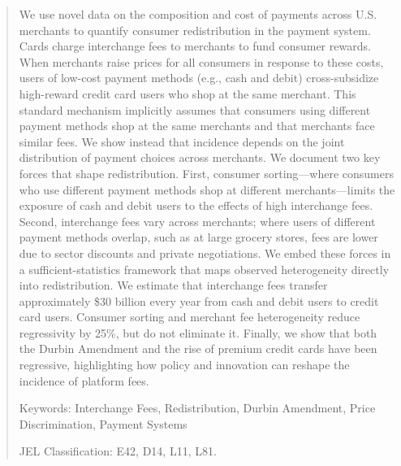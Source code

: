 \documentclass[11pt,english]{article}
\theoremstyle{remark}
\begin{document}
\begin{abstract}
\begin{singlespace}

We use novel data on the composition and cost of payments across U.S. merchants to quantify consumer redistribution in the payment system.
  Cards charge interchange fees to merchants to fund consumer rewards.
  When merchants raise prices for all consumers in response to these costs, users of low-cost payment methods (e.g., cash and debit) cross-subsidize high-reward credit card users who shop at the same merchant.
  This standard mechanism implicitly assumes that consumers using different payment methods shop at the same merchants and that merchants face similar fees. 
  We show instead that incidence depends on the joint distribution of payment choices across merchants.
  We document two key forces that shape redistribution.
  First, consumer sorting---where consumers who use different payment methods shop at different merchants---limits the exposure of cash and debit users to the effects of high interchange fees.
  Second, interchange fees vary across merchants; where users of different payment methods overlap, such as at large grocery stores, fees are lower due to sector discounts and private negotiations.
  We embed these forces in a sufficient-statistics framework that maps observed heterogeneity directly into redistribution.
  We estimate that interchange fees transfer approximately \$30 billion every year from cash and debit users to credit card users.
  Consumer sorting and merchant fee heterogeneity reduce regressivity by 25\%, but do not eliminate it.
  Finally, we show that both the Durbin Amendment and the rise of premium credit cards have been regressive, highlighting how policy and innovation can reshape the incidence of platform fees.

\end{singlespace}

\thispagestyle{empty} \setcounter{page}{0}\begin{flushleft}

Keywords: Interchange Fees, Redistribution, Durbin Amendment, Price Discrimination, Payment Systems

JEL Classification: E42, D14, L11, L81.\end{flushleft}

\end{abstract}
\clearpage{}

 \renewcommand*{\thefootnote}{\arabic{footnote}}
\setcounter{footnote}{0}
\end{document}
